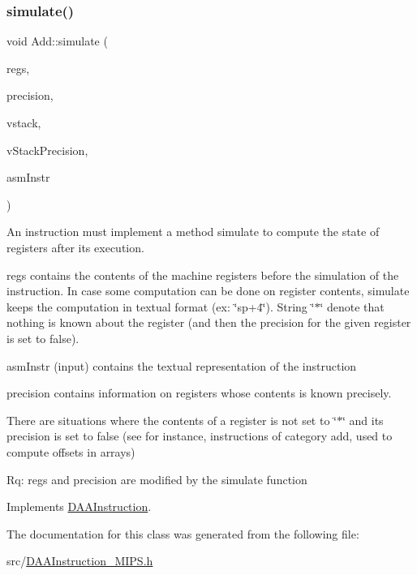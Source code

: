 \subsubsection{\texorpdfstring{simulate()}{simulate()}}
{\footnotesize\ttfamily void Add\+::simulate (\begin{DoxyParamCaption}\item[{vector$<$ string $>$ \&}]{regs,  }\item[{vector$<$ bool $>$ \&}]{precision,  }\item[{\hyperlink{DAAInstruction_8h_a1b0e70ac1a04f06c8132055ed01f589f}{stack\+Type} \&}]{vstack,  }\item[{\hyperlink{DAAInstruction_8h_ac5cb793e9dac3fa9693da78b7e29ab30}{stack\+Prec\+Type} \&}]{v\+Stack\+Precision,  }\item[{const string \&}]{asm\+Instr }\end{DoxyParamCaption})\hspace{0.3cm}{\ttfamily [virtual]}}

An instruction must implement a method simulate to compute the state of registers after its execution.

regs contains the contents of the machine registers before the simulation of the instruction. In case some computation can be done on register contents, simulate keeps the computation in textual format (ex\+: \char`\"{}sp+4\char`\"{}). String \char`\"{}$\ast$\char`\"{} denote that nothing is known about the register (and then the precision for the given register is set to false).

asm\+Instr (input) contains the textual representation of the instruction

precision contains information on registers whose contents is known precisely.

There are situations where the contents of a register is not set to \char`\"{}$\ast$\char`\"{} and its precision is set to false (see for instance, instructions of category add, used to compute offsets in arrays)

Rq\+: regs and precision are modified by the simulate function 

Implements \hyperlink{classDAAInstruction_a61d0b9bece1e0ead89a46c0197276324}{D\+A\+A\+Instruction}.



The documentation for this class was generated from the following file\+:\begin{DoxyCompactItemize}
\item 
src/\hyperlink{DAAInstruction__MIPS_8h}{D\+A\+A\+Instruction\+\_\+\+M\+I\+P\+S.\+h}\end{DoxyCompactItemize}
